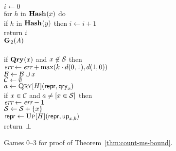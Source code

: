 \begin{figure}
{      $i \gets 0$\\
      for $h$ in $\mathbf{Hash}\hspace{0.5pt}(x)$ do\\
      \tab if $h$ in $\mathbf{Hash}\hspace{0.5pt}(y)$ then $i \gets i+1$\\
      return $i$
    \\[6pt]
    \underline{$\mathbf{G}\hspace{0.5pt}_2(\mathit{A})$}\\[2pt]
    \\
      if $\mathbf{Qry}\hspace{0.5pt}(x)$ and $x \not\in \mathcal{S}$ then\\
      \tab $\textit{err} \gets \textit{err} + \max(k \cdot d(0,1), d(1,0))$\\
      $\mathcal{B} \gets \mathcal{B} \cup x$\\
      $\mathcal{C} \gets \emptyset$\\
      $a \gets \textsc{Qry}[H](\mathsf{repr}, \mathsf{qry}_x)$\\
      if $x \in \mathcal{C}$ and $a \neq [x \in \mathcal{S}]$ then\\
      \tab $\textit{err} \gets \textit{err}-1$\\
      $\mathcal{S} \gets \mathcal{S} + \{x\}$\\
      $\mathsf{repr} \gets \textsc{Up}[H](\mathsf{repr},\mathsf{up}_{x,b})$\\
      return~$\bot$
  }
  {
  }
  {
  }
  \caption{Games 0--3 for proof of Theorem~\ref{thm:count-ms-bound}.}
  \label{fig:count-ms-bound}
\end{figure}

